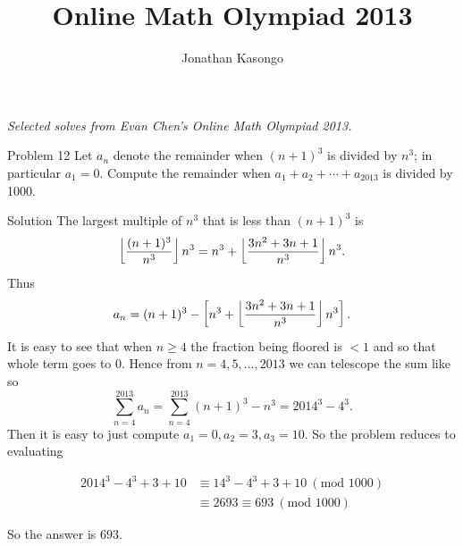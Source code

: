 \documentclass{article}
\author{Jonathan Kasongo}
\title{Online Math Olympiad 2013}
\begin{document}
\maketitle
\textit{Selected solves from Evan Chen's Online Math Olympiad 2013.}

\begin{problem}{Problem 12}
Let $a_n$ denote the remainder when $(n+1)^3$ is divided by $n^3$; in
particular $a_1 = 0$. Compute the remainder when
$a_1 + a_2 + \cdots + a_{2013}$ is divided by 1000.
\end{problem}

\begin{solution}{Solution}
The largest multiple of $n^3$ that is less than $(n+1)^3$
is
$$
\left\lfloor \frac{(n+1)^3}{n^3} \right\rfloor n^3 = n^3 + \left\lfloor \frac{3n^2 + 3n + 1}{n^3} \right\rfloor
n^3.
$$
Thus
$$
a_n = (n+1)^3 - \left[ n^3 + \left\lfloor \frac{3n^2 + 3n + 1}{n^3} \right\rfloor n^3 \right].
$$
It is easy to see that when $n \geq 4$ the fraction being floored is $< 1$
and so that whole term goes to 0. Hence from $n = 4, 5, \ldots, 2013$
we can telescope the sum like so
$$
\sum_{n=4}^{2013} a_n = \sum_{n = 4}^{2013} (n+1)^3 - n^3 = 2014^3 - 4^3.
$$
Then it is easy to just compute $a_1 = 0, a_2 = 3, a_3 = 10$.
So the problem reduces to evaluating

\[
\begin{aligned}
2014^3 - 4^3 + 3 + 10 &\equiv 14^3 - 4^3 + 3 + 10 \ (\text{mod } 1000)\\
&\equiv 2693 \equiv 693 \ (\text{mod } 1000)
\end{aligned}
\]

So the answer is $\boxed{693}$.
\end{solution}
\end{document}

